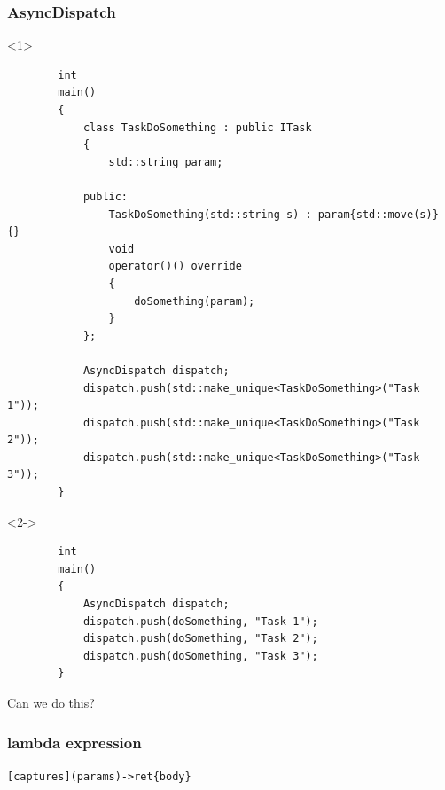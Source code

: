 \documentclass{beamer}
\begin{document}
\begin{frame}[fragile]
\frametitle{AsyncDispatch}
    \begin{onlyenv}<1>
    \begin{lstlisting}
        int
        main()
        {
            class TaskDoSomething : public ITask
            {
                std::string param;

            public:
                TaskDoSomething(std::string s) : param{std::move(s)} {}
                void
                operator()() override
                {
                    doSomething(param);
                }
            };

            AsyncDispatch dispatch;
            dispatch.push(std::make_unique<TaskDoSomething>("Task 1"));
            dispatch.push(std::make_unique<TaskDoSomething>("Task 2"));
            dispatch.push(std::make_unique<TaskDoSomething>("Task 3"));
        }
    \end{lstlisting}
    \end{onlyenv}
    
    \begin{onlyenv}<2->
    \begin{lstlisting}
        int
        main()
        {
            AsyncDispatch dispatch;
            dispatch.push(doSomething, "Task 1");
            dispatch.push(doSomething, "Task 2");
            dispatch.push(doSomething, "Task 3");
        }
    \end{lstlisting}
    \begin{center}
        Can we do this?
    \end{center}
    \end{onlyenv}
\end{frame}

\begin{frame}
\frametitle{lambda expression}
    \begin{center}
        \texttt{[captures](params)->ret\{body\}}
    \end{center}
\end{frame}
\end{document}
